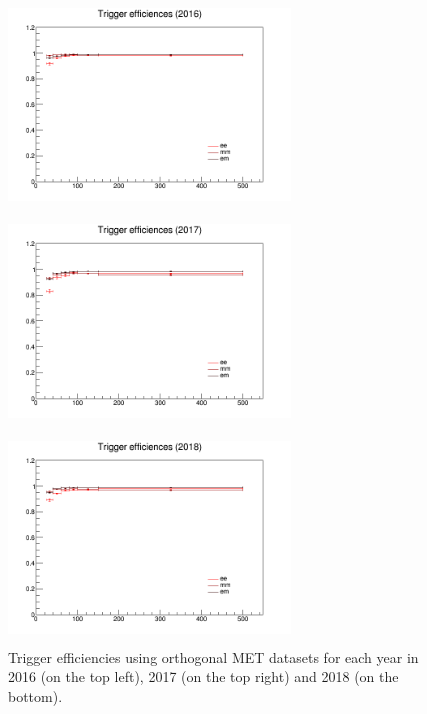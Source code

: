 \documentclass[a4paper, 10pt, openright]{report}
\begin{document}
\begin{figure}[htbp]
\begin{center}
\begin{minipage}[b]{.49\textwidth}
\begin{center}
\includegraphics[width=7.5cm, height=5.6cm]{figs/Efficiency_pt_2016_2016.png}
\end{center}
\end{minipage} \hfill
\begin{minipage}[b]{.49\textwidth}
\begin{center}
\includegraphics[width=7.5cm, height=5.6cm]{figs/Efficiency_pt_2017_2017.png}
\end{center}
\end{minipage} \hfill
\begin{minipage}[b]{.99\textwidth}
\begin{center}
\includegraphics[width=7.5cm, height=5.6cm]{figs/Efficiency_pt_2018_2018.png}
\end{center}
\end{minipage} \hfill
\caption{Trigger efficiencies using orthogonal \ac{MET} datasets for each year in 2016 (on the top left), 2017 (on the top right) and 2018 (on the bottom).}
\label{fig:TriggEff}
\end{center}
\end{figure}
\end{document}
